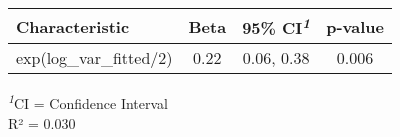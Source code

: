 
\fontsize{12.0pt}{14.4pt}\selectfont
\begin{tabular*}{\linewidth}{@{\extracolsep{\fill}}lccc}
\toprule
\textbf{Characteristic} & \textbf{Beta} & \textbf{95\% CI}\textsuperscript{\textit{1}} & \textbf{p-value} \\ 
\midrule\addlinespace[2.5pt]
exp(log\_var\_fitted/2) & 0.22 & 0.06, 0.38 & 0.006 \\ 
\bottomrule
\end{tabular*}
\begin{minipage}{\linewidth}
\textsuperscript{\textit{1}}CI = Confidence Interval\\
R² = 0.030\\
\end{minipage}


